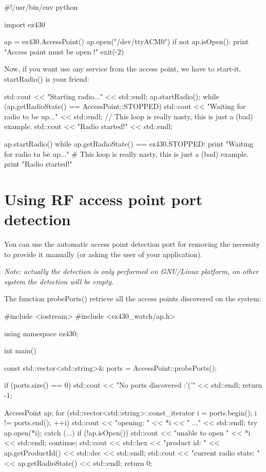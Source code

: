 \documentclass[11pt,a4paper]{article}
\begin{document}
\begin{python}
#!/usr/bin/env python

import ez430

ap = ez430.AccessPoint()
ap.open("/dev/ttyACM0")
if not ap.isOpen():
	print "Access point must be open !"
	exit(-2)
\end{python}

\break
Now, if you want use any service from the access point,
we have to start-it, startRadio() is your friend:

\begin{C++}
std::cout << "Starting radio..." << std::endl;
ap.startRadio();
while (ap.getRadioState() == AccessPoint::STOPPED) {
	std::cout << "Waiting for radio to be up..." << std::endl;
	// This loop is really nasty, this is just a (bad) example.
}
std::cout << "Radio started!" << std::endl;
\end{C++}

\begin{python}
ap.startRadio()
while ap.getRadioState() == ez430.STOPPED:
	print "Waiting for radio tu be up..."
	# This loop is really nasty, this is just a (bad) example.
print "Radio started!"
\end{python}

\break
\section{Using RF access point port detection}

You can use the automatic access point detection port
for removing the necessity to provide it manually
(or asking the user of your application).

\textit{Note: actually the detection is only performed on GNU/Linux
platform, on other system the detection will be empty.}

The function probePorts() retrieve all the access points discovered
on the system:

\begin{C++}
#include <iostream>
#include <ez430_watch/ap.h>

using namespace ez430;

int main()
{
	const std::vector<std::string>& ports = AccessPoint::probePorts();

	if (ports.size() == 0) {
		std::cout << "No ports discovered :'('" << std::endl;
		return -1;
	}

	AccessPoint ap;
	for (std::vector<std::string>::const_iterator
		i = ports.begin(); i != ports.end(); ++i)
	{
		std::cout << "opening: " << *i << " ..." << std::endl;
		try { ap.open(*i); } catch (...) {}
		if (!ap.isOpen()) {
			std::cout << "unable to open " << *i << std::endl;
			continue;
		}
		std::cout << std::hex << "product id: "
				<< ap.getProductId() << std::dec << std::endl;
		std::cout << "current radio state: " << ap.getRadioState() << std::endl;
	}
	return 0;
}
\end{C++}
\end{document}
